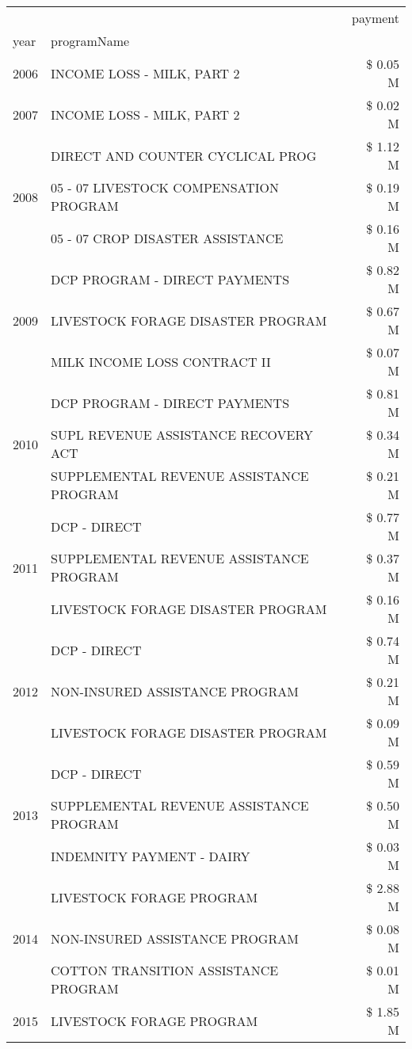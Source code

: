 \begin{tabular}{llr}
\toprule
 &  & payment \\
year & programName &  \\
\midrule
2006 & INCOME LOSS - MILK, PART 2 & \$ 0.05 M \\
\cline{1-3}
2007 & INCOME LOSS - MILK, PART 2 & \$ 0.02 M \\
\cline{1-3}
\multirow[t]{3}{*}{2008} & DIRECT AND COUNTER CYCLICAL PROG & \$ 1.12 M \\
 & 05 - 07 LIVESTOCK COMPENSATION PROGRAM & \$ 0.19 M \\
 & 05 - 07 CROP DISASTER ASSISTANCE & \$ 0.16 M \\
\cline{1-3}
\multirow[t]{3}{*}{2009} & DCP PROGRAM - DIRECT PAYMENTS & \$ 0.82 M \\
 & LIVESTOCK FORAGE DISASTER  PROGRAM & \$ 0.67 M \\
 & MILK INCOME LOSS CONTRACT II & \$ 0.07 M \\
\cline{1-3}
\multirow[t]{3}{*}{2010} & DCP PROGRAM - DIRECT PAYMENTS & \$ 0.81 M \\
 & SUPL REVENUE ASSISTANCE RECOVERY ACT & \$ 0.34 M \\
 & SUPPLEMENTAL REVENUE ASSISTANCE PROGRAM & \$ 0.21 M \\
\cline{1-3}
\multirow[t]{3}{*}{2011} & DCP - DIRECT & \$ 0.77 M \\
 & SUPPLEMENTAL REVENUE ASSISTANCE PROGRAM & \$ 0.37 M \\
 & LIVESTOCK FORAGE DISASTER PROGRAM & \$ 0.16 M \\
\cline{1-3}
\multirow[t]{3}{*}{2012} & DCP - DIRECT & \$ 0.74 M \\
 & NON-INSURED ASSISTANCE PROGRAM & \$ 0.21 M \\
 & LIVESTOCK FORAGE DISASTER PROGRAM & \$ 0.09 M \\
\cline{1-3}
\multirow[t]{3}{*}{2013} & DCP - DIRECT & \$ 0.59 M \\
 & SUPPLEMENTAL REVENUE ASSISTANCE PROGRAM & \$ 0.50 M \\
 & INDEMNITY PAYMENT - DAIRY & \$ 0.03 M \\
\cline{1-3}
\multirow[t]{3}{*}{2014} & LIVESTOCK FORAGE PROGRAM & \$ 2.88 M \\
 & NON-INSURED ASSISTANCE PROGRAM & \$ 0.08 M \\
 & COTTON TRANSITION ASSISTANCE PROGRAM & \$ 0.01 M \\
\cline{1-3}
\multirow[t]{3}{*}{2015} & LIVESTOCK FORAGE PROGRAM & \$ 1.85 M \\

\end{tabular}

